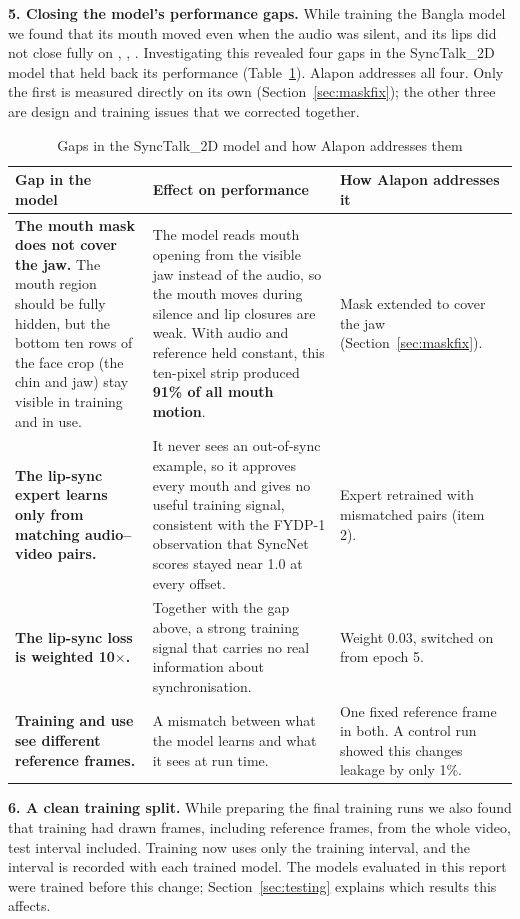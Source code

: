 \noindent
\textbf{5. Closing the model's performance gaps.} While training the Bangla model we found that its mouth moved even when the audio was silent, and its lips did not close fully on , , . Investigating this revealed four gaps in the SyncTalk\_2D model that held back its performance (Table~\ref{tab:gaps}). Alapon addresses all four. Only the first is measured directly on its own (Section~\ref{sec:maskfix}); the other three are design and training issues that we corrected together.

\begin{table}[H]
\centering
\caption{Gaps in the SyncTalk\_2D model and how Alapon addresses them}
\label{tab:gaps}
\renewcommand{\arraystretch}{1.3}
\begin{tabular}{|p{4.2cm}|p{5.3cm}|p{3.7cm}|}
\hline
\textbf{Gap in the model} & \textbf{Effect on performance} & \textbf{How Alapon addresses it} \\
\hline
\textbf{The mouth mask does not cover the jaw.} The mouth region should be fully hidden, but the bottom ten rows of the face crop (the chin and jaw) stay visible in training and in use. & The model reads mouth opening from the visible jaw instead of the audio, so the mouth moves during silence and lip closures are weak. With audio and reference held constant, this ten-pixel strip produced \textbf{91\% of all mouth motion}. & Mask extended to cover the jaw (Section~\ref{sec:maskfix}). \\
\hline
\textbf{The lip-sync expert learns only from matching audio--video pairs.} & It never sees an out-of-sync example, so it approves every mouth and gives no useful training signal, consistent with the FYDP-1 observation that SyncNet scores stayed near 1.0 at every offset. & Expert retrained with mismatched pairs (item 2). \\
\hline
\textbf{The lip-sync loss is weighted 10$\times$.} & Together with the gap above, a strong training signal that carries no real information about synchronisation. & Weight 0.03, switched on from epoch 5. \\
\hline
\textbf{Training and use see different reference frames.} & A mismatch between what the model learns and what it sees at run time. & One fixed reference frame in both. A control run showed this changes leakage by only 1\%. \\
\hline
\end{tabular}
\end{table}

\noindent
\textbf{6. A clean training split.} While preparing the final training runs we also found that training had drawn frames, including reference frames, from the whole video, test interval included. Training now uses only the training interval, and the interval is recorded with each trained model. The models evaluated in this report were trained before this change; Section~\ref{sec:testing} explains which results this affects.\\

